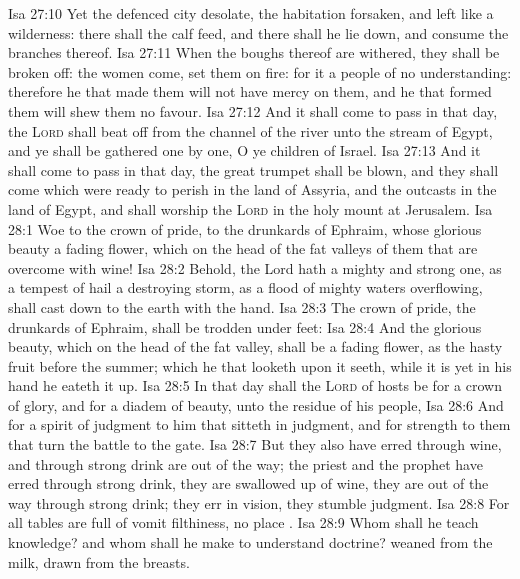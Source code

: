 \vs Isa 27:10 Yet the defenced city  desolate,  the habitation forsaken, and left like a wilderness: there shall the calf feed, and there shall he lie down, and consume the branches thereof.
\vs Isa 27:11 When the boughs thereof are withered, they shall be broken off: the women come,  set them on fire: for it  a people of no understanding: therefore he that made them will not have mercy on them, and he that formed them will shew them no favour.
\vs Isa 27:12 And it shall come to pass in that day,  the \textsc{Lord} shall beat off from the channel of the river unto the stream of Egypt, and ye shall be gathered one by one, O ye children of Israel.
\vs Isa 27:13 And it shall come to pass in that day,  the great trumpet shall be blown, and they shall come which were ready to perish in the land of Assyria, and the outcasts in the land of Egypt, and shall worship the \textsc{Lord} in the holy mount at Jerusalem.
\vs Isa 28:1 Woe to the crown of pride, to the drunkards of Ephraim, whose glorious beauty  a fading flower, which  on the head of the fat valleys of them that are overcome with wine!
\vs Isa 28:2 Behold, the Lord hath a mighty and strong one,  as a tempest of hail  a destroying storm, as a flood of mighty waters overflowing, shall cast down to the earth with the hand.
\vs Isa 28:3 The crown of pride, the drunkards of Ephraim, shall be trodden under feet:
\vs Isa 28:4 And the glorious beauty, which  on the head of the fat valley, shall be a fading flower,  as the hasty fruit before the summer; which  he that looketh upon it seeth, while it is yet in his hand he eateth it up.
\vs Isa 28:5 In that day shall the \textsc{Lord} of hosts be for a crown of glory, and for a diadem of beauty, unto the residue of his people,
\vs Isa 28:6 And for a spirit of judgment to him that sitteth in judgment, and for strength to them that turn the battle to the gate.
\vs Isa 28:7 But they also have erred through wine, and through strong drink are out of the way; the priest and the prophet have erred through strong drink, they are swallowed up of wine, they are out of the way through strong drink; they err in vision, they stumble  judgment.
\vs Isa 28:8 For all tables are full of vomit  filthiness,  no place .
\vs Isa 28:9 Whom shall he teach knowledge? and whom shall he make to understand doctrine?  weaned from the milk,  drawn from the breasts.
